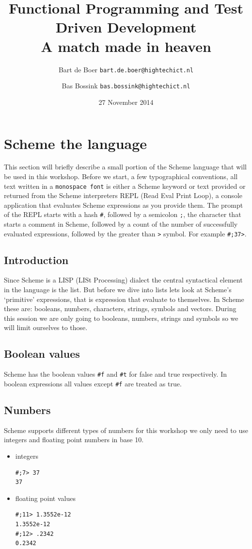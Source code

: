 \documentclass[12pt,a4paper,english,twoside]{article}
\author{
    Bart de Boer \texttt{bart.de.boer@hightechict.nl}
    \and
    Bas Bossink \texttt{bas.bossink@hightechict.nl}
}
\date{27 November 2014}
\title{Functional Programming and Test Driven Development\\
\vspace{2 mm} {\large A match made in heaven}}
\begin{document}
\maketitle
\section{Scheme the language}
This section will briefly describe a small portion of the Scheme language that 
will be used in this workshop.
Before we start, a few typographical conventions, all text written in a 
\texttt{monospace font} is either a Scheme keyword or text provided or 
returned from the Scheme interpreters REPL (Read Eval Print Loop), a console 
application that evaluates Scheme expressions as you provide them. The prompt 
of the REPL starts with a hash \texttt{\#}, followed by a semicolon \texttt{;}, the 
character that starts a comment in Scheme, followed by a count of the number 
of successfully evaluated expressions, followed by the greater than \texttt{>} 
symbol. For example \texttt{\#;37>}.
\subsection{Introduction}
Since Scheme is a LISP (LISt Processing) dialect the central syntactical 
element in the language is the list. But before we dive into lists lets look 
at Scheme's `primitive' expressions, that is expression that evaluate to 
themselves. In Scheme these are: booleans, numbers, characters, strings, 
symbols and vectors. During this session we are only going to booleans, 
numbers, strings and symbols so we will limit ourselves to those.
\subsection{Boolean values}
Scheme has the boolean values \texttt{\#f} and \texttt{\#t} for false and true 
respectively. In boolean expressions all values except \texttt{\#f} are 
treated as true.
\subsection{Numbers}
Scheme supports different types of numbers for this workshop we only need to 
use integers and floating point numbers in base 10.
\begin{itemize}
\item integers 
\begin{lstlisting}
#;7> 37
37
\end{lstlisting}
\item floating point values
\begin{lstlisting}
#;11> 1.3552e-12
1.3552e-12 
#;12> .2342
0.2342
\end{lstlisting}
\end{itemize}
\end{document}
